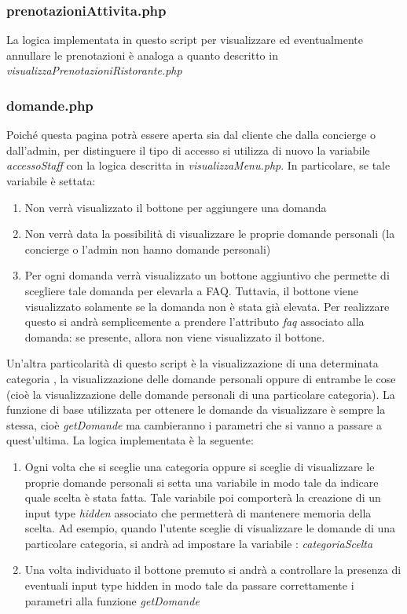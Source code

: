 \documentclass [a4paper, 12pt]{book}
\begin{document}
\subsubsection{prenotazioniAttivita.php}
La logica implementata in questo script per visualizzare ed eventualmente annullare le prenotazioni è analoga a quanto descritto in \textit{visualizzaPrenotazioniRistorante.php}

\subsubsection{domande.php}
Poiché questa pagina potrà essere aperta sia dal cliente che dalla concierge o dall'admin, per distinguere il tipo di accesso si utilizza di nuovo la variabile \textit{accessoStaff} con la logica descritta in \textit{visualizzaMenu.php}. In particolare, se tale variabile è settata:
\begin{enumerate}
\item Non verrà visualizzato il bottone per aggiungere una domanda
\item Non verrà data la possibilità di visualizzare le proprie domande personali (la concierge o l'admin non hanno domande personali)
\item Per ogni domanda verrà visualizzato un bottone aggiuntivo che permette di scegliere tale domanda per elevarla a FAQ. Tuttavia, il bottone viene visualizzato solamente se la domanda non è stata già elevata. Per realizzare questo si andrà semplicemente a prendere l'attributo \textit{faq} associato alla domanda: se presente, allora non viene visualizzato il bottone.
\end{enumerate}
Un'altra particolarità di questo script è la visualizzazione di una determinata categoria , la visualizzazione delle domande personali oppure di entrambe le cose (cioè la visualizzazione delle domande personali di una particolare categoria). La funzione di base utilizzata per ottenere le domande da visualizzare è sempre la stessa, cioè \textit{getDomande} ma cambieranno i parametri che si vanno a passare a quest'ultima. La logica implementata è la seguente: 
\begin{enumerate}
\item Ogni volta che si sceglie una categoria oppure si sceglie di visualizzare le proprie domande personali si setta una variabile in modo tale da indicare quale scelta è stata fatta. Tale variabile poi comporterà la creazione di un input type \textit{hidden} associato che permetterà di mantenere memoria della scelta. Ad esempio, quando l'utente sceglie di visualizzare le domande di una particolare categoria, si andrà ad impostare la variabile : \textit{categoriaScelta}
\item Una volta individuato il bottone premuto si andrà a controllare la presenza di eventuali input type hidden in modo tale da passare correttamente i parametri alla funzione \textit{getDomande}
\end{enumerate}
\end{document}
